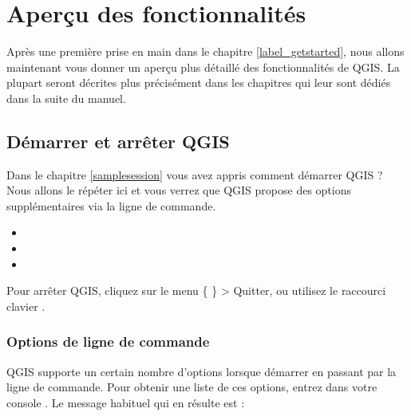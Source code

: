 \section{Aperçu des fonctionnalités}\label{feature_glance}

Après une première prise en main dans le chapitre \ref{label_getstarted}, nous allons maintenant vous donner un aperçu plus détaillé des fonctionnalités de QGIS. La plupart seront décrites plus précisément dans les chapitres qui leur sont dédiés dans la suite du manuel.

\subsection{Démarrer et arrêter QGIS}\label{label_startinqgis}

Dans le chapitre \ref{samplesession} vous avez appris comment démarrer QGIS ? Nous allons le répéter ici et vous verrez que QGIS propose des options supplémentaires via la ligne de commande.

\begin{itemize}
\item {} 
\item {}
\item {}
\end{itemize} 

Pour arrêter QGIS, cliquez sur le menu \{\nix{} \} > Quitter, ou utilisez le raccourci clavier .

\subsubsection{Options de ligne de commande}
\label{label_commandline}

\nix QGIS supporte un certain nombre d'options lorsque démarrer en passant par la ligne de commande. Pour obtenir une liste de ces options, entrez dans votre console . Le message habituel qui en résulte est :

